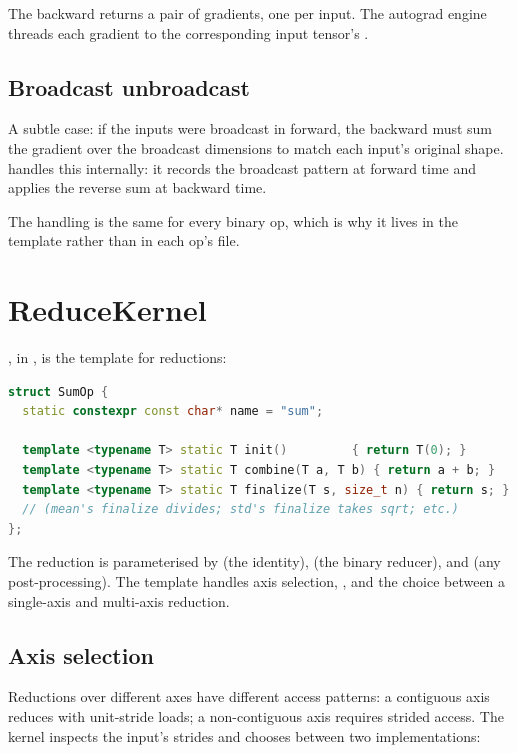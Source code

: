 The backward returns a pair of gradients, one per input. The
autograd engine threads each gradient to the corresponding input
tensor's .

\subsection{Broadcast unbroadcast}
\label{ssec:kernel_abstraction:unbroadcast}

A subtle case: if the inputs were broadcast in forward, the
backward must sum the gradient over the broadcast dimensions to
match each input's original shape.  handles
this internally: it records the broadcast pattern at forward time
and applies the reverse sum at backward time.

The handling is the same for every binary op, which is why it lives
in the template rather than in each op's file.

\section{ReduceKernel}
\label{sec:kernel_abstraction:reduce}

, in ,
is the template for reductions:

\begin{lstlisting}[style=lucidcpp,language=C++]
struct SumOp {
  static constexpr const char* name = "sum";

  template <typename T> static T init()         { return T(0); }
  template <typename T> static T combine(T a, T b) { return a + b; }
  template <typename T> static T finalize(T s, size_t n) { return s; }
  // (mean's finalize divides; std's finalize takes sqrt; etc.)
};
\end{lstlisting}

The reduction is parameterised by  (the identity),
 (the binary reducer), and  (any
post-processing). The template handles axis selection,
, and the choice between a single-axis and
multi-axis reduction.

\subsection{Axis selection}
\label{ssec:kernel_abstraction:axis_select}

Reductions over different axes have different access patterns: a
contiguous axis reduces with unit-stride loads; a non-contiguous
axis requires strided access. The kernel inspects the input's
strides and chooses between two implementations:

